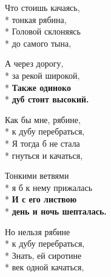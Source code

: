 \medskip

\begin{minipage}{\linewidth}
Что стоишь качаясь,\\*
тонкая рябина,\\*
Головой склоняясь\\*
до самого тына,\\
\end{minipage}\par\medskip\nobreak

\medskip

\begin{minipage}{\linewidth}
А через дорогу,\\*
за рекой широкой,\\*
\textbf{Также одиноко}\\*
\textbf{дуб стоит высокий.}\\
\end{minipage}\par\medskip\nobreak

\medskip

\begin{minipage}{\linewidth}
Как бы мне, рябине,\\*
к дубу перебраться,\\*
Я тогда б не стала\\*
гнуться и качаться,\\
\end{minipage}\par\medskip\nobreak

\medskip

\begin{minipage}{\linewidth}
Тонкими ветвями\\*
я б к нему прижалась\\*
\textbf{И с его листвою}\\*
\textbf{день и ночь шепталась.}\\
\end{minipage}\par\medskip\nobreak

\medskip

\begin{minipage}{\linewidth}
Но нельзя рябине\\*
к дубу перебраться,\\*
Знать, ей сиротине\\*
век одной качаться,\\
\end{minipage}\par\medskip\nobreak

